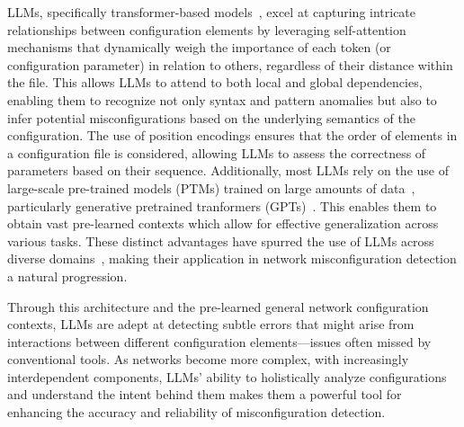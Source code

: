 LLMs, specifically transformer-based models~\cite{vaswani2017attention,hill2024transformers,lin2022survey}, excel at capturing intricate relationships between configuration elements by leveraging self-attention mechanisms that dynamically weigh the importance of each token (or configuration parameter) in relation to others, regardless of their distance within the file. This allows LLMs to attend to both local and global dependencies, enabling them to recognize not only syntax and pattern anomalies but also to infer potential misconfigurations based on the underlying semantics of the configuration. The use of position encodings ensures that the order of elements in a configuration file is considered, allowing LLMs to assess the correctness of parameters based on their sequence. Additionally, most LLMs rely on the use of large-scale pre-trained models (PTMs) trained on large amounts of data~\cite{qiu2020pre}, particularly generative pretrained tranformers (GPTs)~\cite{achiam2023gpt,touvron2023llama,shanahan2024talking,taylor2023galactica,brown2020language,chowdhery2023palm}. This enables them to obtain vast pre-learned contexts which allow for effective generalization across various tasks.
These distinct advantages have spurred the use of LLMs across diverse domains~\cite{carion2020end,sheng2019nrtr,neil2020transformers,parmar2018image,chen2021developing,gulati2020conformer}, making their application in network misconfiguration detection a natural progression.

Through this architecture and the pre-learned general network configuration contexts, LLMs are adept at detecting subtle errors that might arise from interactions between different configuration elements—issues often missed by conventional tools. As networks become more complex, with increasingly interdependent components, LLMs' ability to holistically analyze configurations and understand the intent behind them makes them a powerful tool for enhancing the accuracy and reliability of misconfiguration detection.



